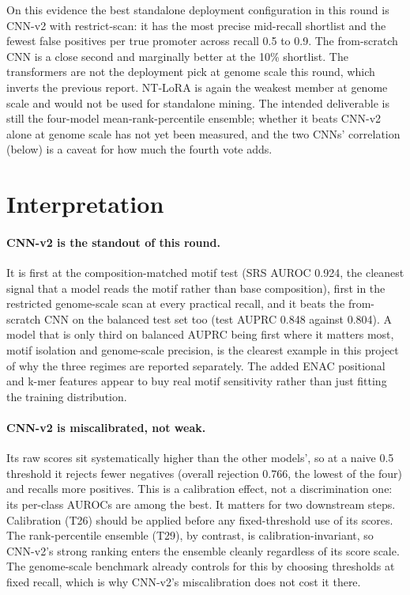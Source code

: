 \documentclass{article}
\begin{document}
On this evidence the best standalone deployment configuration in this round is CNN-v2 with restrict-scan: it has the most precise mid-recall shortlist and the fewest false positives per true promoter across recall 0.5 to 0.9. The from-scratch CNN is a close second and marginally better at the 10\% shortlist. The transformers are not the deployment pick at genome scale this round, which inverts the previous report. NT-LoRA is again the weakest member at genome scale and would not be used for standalone mining. The intended deliverable is still the four-model mean-rank-percentile ensemble; whether it beats CNN-v2 alone at genome scale has not yet been measured, and the two CNNs' correlation (below) is a caveat for how much the fourth vote adds.

\section{Interpretation}\label{sec:interp}

\paragraph{CNN-v2 is the standout of this round.} It is first at the composition-matched motif test (SRS AUROC 0.924, the cleanest signal that a model reads the motif rather than base composition), first in the restricted genome-scale scan at every practical recall, and it beats the from-scratch CNN on the balanced test set too (test AUPRC 0.848 against 0.804). A model that is only third on balanced AUPRC being first where it matters most, motif isolation and genome-scale precision, is the clearest example in this project of why the three regimes are reported separately. The added ENAC positional and k-mer features appear to buy real motif sensitivity rather than just fitting the training distribution.

\paragraph{CNN-v2 is miscalibrated, not weak.} Its raw scores sit systematically higher than the other models', so at a naive 0.5 threshold it rejects fewer negatives (overall rejection 0.766, the lowest of the four) and recalls more positives. This is a calibration effect, not a discrimination one: its per-class AUROCs are among the best. It matters for two downstream steps. Calibration (T26) should be applied before any fixed-threshold use of its scores. The rank-percentile ensemble (T29), by contrast, is calibration-invariant, so CNN-v2's strong ranking enters the ensemble cleanly regardless of its score scale. The genome-scale benchmark already controls for this by choosing thresholds at fixed recall, which is why CNN-v2's miscalibration does not cost it there.
\end{document}

